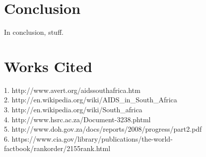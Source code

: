 \documentclass[letterpaper,12pt]{article}
\begin{document}
\section{Conclusion}
In conclusion, stuff.

\section{Works Cited}
1. http://www.avert.org/aidssouthafrica.htm\\
2. http://en.wikipedia.org/wiki/AIDS\_in\_South\_Africa\\
3. http://en.wikipedia.org/wiki/South\_africa\\
4. http://www.hsrc.ac.za/Document-3238.phtml\\
5. http://www.doh.gov.za/docs/reports/2008/progress/part2.pdf\\
6. https://www.cia.gov/library/publications/the-world-factbook/rankorder/2155rank.html\\
\end{document}
